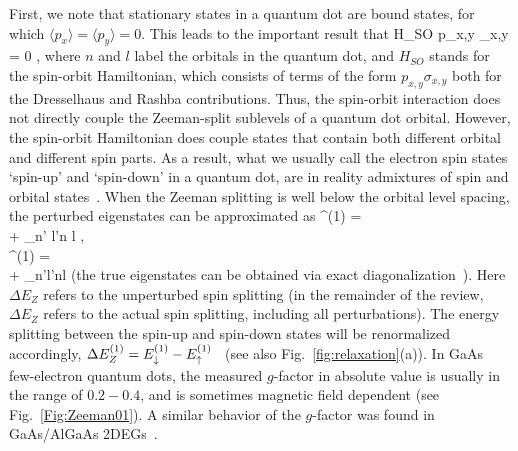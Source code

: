 \documentclass[rmp,twocolumn,aps]{revtex4}
\begin{document}
First, we note that stationary states in a quantum dot are bound
states, for which $\langle p_x \rangle = \langle p_y \rangle = 0$.
This leads to the important result that 
\be 
{} H_{SO}  
\propto {} p_{x,y}  \bra{\down} \sigma_{x,y} \ket{\up} = 0 \;, 
\ee 
where $n$ and $l$ label the orbitals in
the quantum dot, and 
$H_{SO}$ stands for the spin-orbit Hamiltonian, which consists of terms of the form $p_{x,y} \sigma_{x,y}$ both for the Dresselhaus and Rashba contributions. Thus, the spin-orbit
interaction does not directly couple the Zeeman-split
sublevels of a quantum dot orbital. However, the spin-orbit 
Hamiltonian does couple states that contain both different orbital 
and different spin parts\cite{khaetskii00}. As a result, what we
usually call the electron spin states `spin-up' and `spin-down' in
a quantum dot, are in reality admixtures of spin and orbital
states~\cite{khaetskii01}. When the Zeeman splitting is well below
the orbital level spacing, the perturbed eigenstates can be
approximated as \bea
{}^{(1)} =  \hspace*{3.5cm} \nonumber \\
 + \sum_{n' l'\neq n l}
  \;, \hspace*{-.5cm}
\label{eq:SO_zeeman}
\\
^{(1)} =   \hspace*{3.5cm} \nonumber\\
+ \sum_{n'l'\neq nl}  
\hspace*{-.5cm} \label{eq:SO_zeeman2} 
\eea 
(the true eigenstates can be obtained via exact
diagonalization~\cite{cheng04}). Here $\Delta E_Z$ refers to the unperturbed spin splitting (in the remainder of the review, $\Delta E_Z$ refers to the actual spin splitting, including all perturbations). The energy splitting between the spin-up and spin-down states will be renormalized accordingly, $\Delta E_Z^{(1)} = E_\downarrow^{(1)} - E_\uparrow^{(1)}$~\cite{sousa03b,stano05} (see also Fig.~\ref{fig:relaxation}(a)). In GaAs few-electron quantum dots, the measured $g$-factor in absolute value is usually in the range of $0.2 - 0.4$, and is sometimes magnetic field dependent (see Fig.~\ref{Fig:Zeeman01}). A similar behavior of the $g$-factor was found in GaAs/AlGaAs 2DEGs~\cite{dobers88}.
\end{document}
